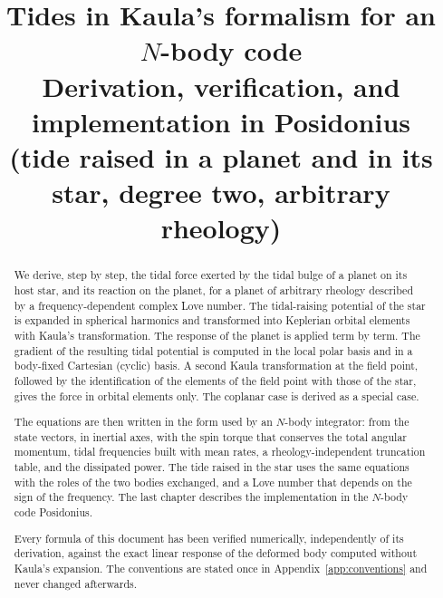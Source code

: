 \documentclass[11pt,a4paper]{report}
\title{Tides in Kaula's formalism for an $N$-body code\\[1ex]
\large Derivation, verification, and implementation in Posidonius\\ (tide raised in a planet and in its star, degree two, arbitrary rheology)}
\author{}
\date{}
\numberwithin{equation}{chapter}
\begin{document}
\maketitle

\begin{abstract}
We derive, step by step, the tidal force exerted by the tidal bulge of a planet on its host star, and its reaction on the planet, for a planet of arbitrary rheology described by a frequency-dependent complex Love number. The tidal-raising potential of the star is expanded in spherical harmonics and transformed into Keplerian orbital elements with Kaula's transformation. The response of the planet is applied term by term. The gradient of the resulting tidal potential is computed in the local polar basis and in a body-fixed Cartesian (cyclic) basis. A second Kaula transformation at the field point, followed by the identification of the elements of the field point with those of the star, gives the force in orbital elements only. The coplanar case is derived as a special case.

The equations are then written in the form used by an $N$-body integrator: from the state vectors, in inertial axes, with the spin torque that conserves the total angular momentum, tidal frequencies built with mean rates, a rheology-independent truncation table, and the dissipated power. The tide raised in the star uses the same equations with the roles of the two bodies exchanged, and a Love number that depends on the sign of the frequency. The last chapter describes the implementation in the $N$-body code Posidonius.

Every formula of this document has been verified numerically, independently of its derivation, against the exact linear response of the deformed body computed without Kaula's expansion. The conventions are stated once in Appendix~\ref{app:conventions} and never changed afterwards.
\end{abstract}

\tableofcontents












\appendix









\end{document}
